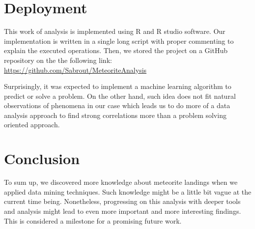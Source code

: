 \section{Deployment}
This work of analysis is implemented using R and R studio software. Our implementation is written in a single long script with proper commenting to explain the executed operations. Then, we stored the project on a GitHub repository on the the following link: \\
\url{https://github.com/Sabrout/MeteoriteAnalysis}

Surprisingly, it was expected to implement a machine learning algorithm to predict or solve a problem. On the other hand, such idea does not fit natural observations of phenomena in our case which leads us to do more of a data analysis approach to find strong correlations more than a problem solving oriented approach. 

\section{Conclusion}
To sum up, we discovered more knowledge about meteorite landings when we applied data mining techniques. Such knowledge might be a little bit vague at the current time being. Nonetheless, progressing on this analysis with deeper tools and analysis might lead to even more important and more interesting findings. This is considered a milestone for a promising future work. 

%
%
%
%
%
%
%


